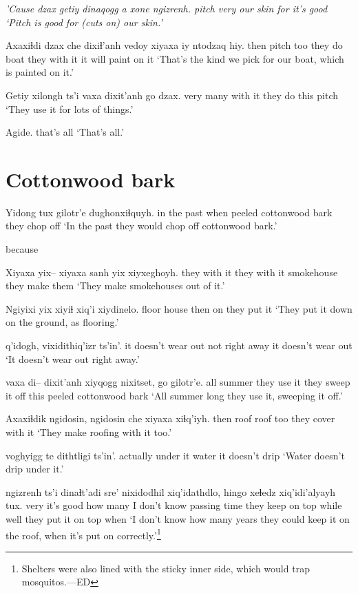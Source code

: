 \documentclass[12pt]{article}
\begin{document}
\gll \em 'Cause \em dzax getiy dinaqogg a xone ngizrenh.
{}     pitch very {our skin} {} for {it's good}
\glt `Pitch is good for (cuts on) our skin.'
\glend

\gll Axaxiɬdi dzax che dixiɬ'anh vedoy xiyaxa iy ntodzaq hiy.
then     pitch too {they do} boat {they with it} it {will paint on} it
\glt `That's the kind we pick for our boat, which is painted on it.'
\glend

\gll Getiy {xilongh ts'i} vaxa dixit'anh go dzax.
very {many} {with it} {they do} this pitch
\glt `They use it for lots of things.'
\glend

\gll Agide.
{{that's all}}
\glt `That's all.'
\glend

\section{Cottonwood bark}

\gll Yidong tux gilotr'e               dughonxiɬquyh. 
{in the past} when {peeled cottonwood bark} {they chop off}
\glt `In the past they would chop off cottonwood bark.'
\glend

because 

\gll Xiyaxa yix--  xiyaxa {sanh yix} xiyxeghoyh.
{they with it} {} {they with it} {smokehouse} {they make them}
\glt `They make smokehouses out of it.'
\glend

\gll Ngiyixi yix xiyiɬ xiq'i xiydinelo.
floor house then on {they put it}
\glt `They put it down on the ground, as flooring.'
\glend

    q'idogh,      {vixidithiq'izr ts'in'.}
{it doesn't wear out}  {not right away} {it doesn't wear out} 
\glt `It doesn't wear out right away.'
\glend

  {vaxa di-- dixit'anh} {xiyqogg nixitset,} go gilotr'e. 
{all summer}  {they use it}         {they sweep it off} this {peeled cottonwood bark}
\glt `All summer long they use it, sweeping it off.'
\glend

\gll Axaxiɬdik ngidosin, ngidosin che {xiyaxa xiɬq'iyh}.
then     roof roof too {they cover with it}
\glt `They make roofing with it too.'
\glend

 voghyigg te {dithtligi ts'in'}. 
actually           {under it} water {it doesn't drip}
\glt `Water doesn't drip under it.'
\glend

 ngizrenh ts'i dinaɬt'adi sre' nixidodhil xiq'idathdlo, hingo xeɬedz xiq'idi'alyayh tux.  
very {it's good} {} {how many} {I don't know} {passing time} {they keep on top} while well  {they put it on top} when
\glt `I don't know how many years they could keep it on the roof, when it's put on correctly.'\footnote{Shelters were also lined with the sticky inner side, which would trap mosquitos.---ED}
\glend
\end{document}
